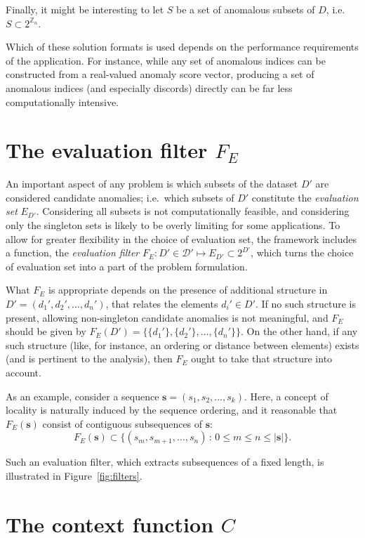 Finally, it might be interesting to let $S$ be a set of anomalous subsets of $D$, i.e.\ $S \subset 2^{\mathbb{Z}_n}$.

Which of these solution formats is used depends on the performance requirements of the application. For instance, while any set of anomalous indices can be constructed from a real-valued anomaly score vector, producing a set of anomalous indices (and especially discords) directly can be far less computationally intensive.

\section{The evaluation filter $F_E$}

An important aspect of any problem is which subsets of the dataset $D'$ are considered candidate anomalies; i.e.\ which subsets of $D'$ constitute the \emph{evaluation set} $E_{D'}$. Considering all subsets is not computationally feasible, and considering only the singleton sets is likely to be overly limiting for some applications. To allow for greater flexibility in the choice of evaluation set, the framework includes a function, the \emph{evaluation filter} $F_E: D' \in \mathcal{D}' \mapsto E_{D'} \subset 2^{D'}$, which turns the choice of evaluation set into a part of the problem formulation.

What $F_E$ is appropriate depends on the presence of additional structure in $D' = (d_1', d_2', \dots, d_n')$, that relates the elements $d_i' \in D'$. If no such structure is present, allowing non-singleton candidate anomalies is not meaningful, and $F_E$ should be given by $F_E(D') = \{\{d_1'\}, \{d_2'\}, \dots, \{d_n'\}\}$. On the other hand, if any such structure (like, for instance, an ordering or distance between elements) exists (and is pertinent to the analysis), then $F_E$ ought to take that structure into account.

As an example, consider a sequence $\mathbf{s} = (s_1, s_2, \dots, s_k)$. Here, a concept of locality is naturally induced by the sequence ordering, and it reasonable that $F_E(\mathbf{s})$ consist of contiguous subsequences of $\mathbf{s}$:
\[
    F_E(\mathbf{s}) \subset \{ (s_m, s_{m+1}, \dots, s_n) \,:\, 0 \leq m \leq n \leq |\mathbf{s}|\}.
\]

Such an evaluation filter, which extracts subsequences of a fixed length, is illustrated in Figure~\ref{fig:filters}.

\section{The context function $C$}

